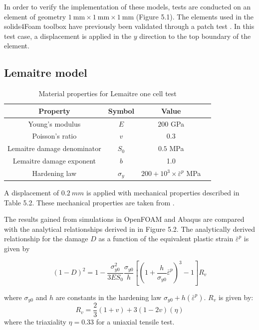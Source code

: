 \documentclass[sn-mathphys,Numbered,draft]{sn-jnl}%
\begin{document}
\begin{appendices}
In order to verify the implementation of these models, tests are conducted on an element of geometry $1\ \text{mm}\times1\ \text{mm}\times1\ \text{mm}$ (Figure 5.1). The elements used in the solids4Foam toolbox have previously been validated through a patch test \cite{cardiff_patch_nodate}. In this test case, a displacement is applied in the $y$ direction to the top boundary of the element.

\subsection{Lemaitre model}

\begin{table}[htb]
	\centering
		\begin{tabular}{cccc} \hline
			Property & Symbol & Value  \\ \hline 
			Young's modulus & $E$ & $200$ GPa \\
			Poisson's ratio & $v$ & $0.3$   \\
			Lemaitre damage denominator & $S_0$ & $0.5$ MPa  \\
			Lemaitre damage exponent & $b$ & 1.0  \\
			Hardening law & $\sigma_y$ & $200+10^3\times{\bar{\varepsilon}}^p$ MPa  \\
			\hline
		\end{tabular}
	\caption{Material properties for Lemaitre one cell test}
	\label{tab:material_properties}
\end{table}

A displacement of $0.2\ mm$ is applied with mechanical properties described in Table 5.2. These mechanical properties are taken from \citet{autay_numerical_2018}.

The results gained from simulations in OpenFOAM and Abaqus are compared with the analytical relationships derived in \citet{doghri_numerical_1995} in Figure 5.2. The analytically derived relationship for the damage $D$ as a function of the equivalent plastic strain ${\bar{\varepsilon}}^p$ is given by

\begin{equation}
(1-D)^2=1-\frac{\sigma_{y0}^2}{3 E S_0} \frac{\sigma_{y0}}{h}\left[\left(1+\frac{h}{\sigma_{y0}} {\bar{\varepsilon}}^p\right)^3-1\right] R_v
\end{equation}

where $\sigma_{y0}$ and $h$ are constants in the hardening law $\sigma_{y0}+h({\bar{\varepsilon}}^p)$. $R_v$ is given by:
\begin{equation}
    R_v=\frac{2}{3}(1+v)+3(1-2v)(\eta)
\end{equation}
where the triaxiality $\eta=0.33$ for a uniaxial tensile test.


\end{appendices}
\end{document}
